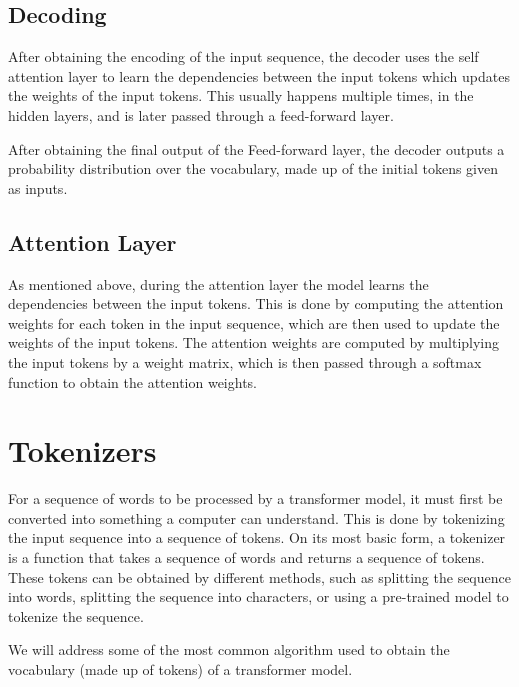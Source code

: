 \subsection{Decoding}\label{Section2.1.2}
After obtaining the encoding of the input sequence, the decoder uses the self attention layer to learn the dependencies between the input tokens which 
updates the weights of the input tokens. This usually happens multiple times, in the hidden layers, and is later passed through a feed-forward layer.

After obtaining the final output of the Feed-forward layer, the decoder outputs a probability distribution over the vocabulary, made up of the initial tokens given as inputs.

\subsection{Attention Layer}\label{Section2.1.3}
As mentioned above, during the attention layer the model learns the dependencies between the input tokens. 
This is done by computing the attention weights for each token in the input sequence, which are then used to update the weights of the input tokens.
The attention weights are computed by multiplying the input tokens by a weight matrix, which is then passed through a softmax function to obtain the attention weights.

\section{Tokenizers}\label{Section2.2}
For a sequence of words to be processed by a transformer model, it must first be converted into something a computer can understand.
This is done by tokenizing the input sequence into a sequence of tokens.
On its most basic form, a tokenizer is a function that takes a sequence of words and returns a sequence of tokens.
These tokens can be obtained by different methods, such as splitting the sequence into words, splitting the sequence into characters, or using a pre-trained model to tokenize the sequence.

We will address some of the most common algorithm used to obtain the vocabulary (made up of tokens) of a transformer model.

